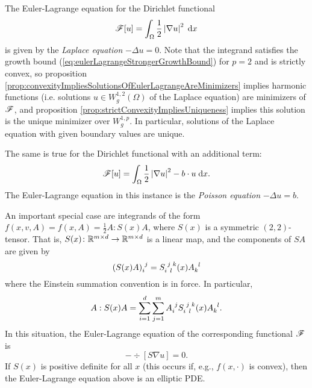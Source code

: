 \begin{example}
    The Euler-Lagrange equation for the Dirichlet functional
    \begin{equation}
        \mathscr{F}[u] = \int_{\Omega} \frac{1}{2}\left\lvert {\nabla u} \right\rvert^2 \; \mathrm{d} x
    \end{equation}
    is given by the \textit{Laplace equation} $-\Delta u = 0$. Note that the integrand satisfies the growth bound (\ref{eq:eulerLagrangeStrongerGrowthBound}) for $p=2$ and is strictly convex, so proposition \ref{prop:convexityImpliesSolutionsOfEulerLagrangeAreMinimizers} implies harmonic functions (i.e. solutions $u \in W^{1,2}_g(\Omega)$ of the Laplace equation) are minimizers of $\mathscr{F}$, and proposition \ref{prop:strictConvexityImpliesUniqueness} implies this solution is the unique minimizer over $W^{1,p}_g$. In particular, solutions of the Laplace equation with given boundary values are unique.

    The same is true for the Dirichlet functional with an additional term:
    \begin{equation}
        \mathscr{F}[u] = \int_\Omega \frac{1}{2}\left\lvert {\nabla u} \right\rvert^2 - b \cdot u \; \mathrm{d} x.
    \end{equation}
    The Euler-Lagrange equation in this instance is the \textit{Poisson equation} $- \Delta u = b$.
\end{example}

An important special case are integrands of the form $f(x,v,A) = f(x,A) = \frac{1}{2}A:S(x)A$, where $S(x)$ is a symmetric $(2,2)$-tensor. That is, $S(x) \colon \mathbb{R}^{m \times d} \to \mathbb{R}^{m \times d}$ is a linear map, and the components of $SA$ are given by 
\begin{equation}
    \tensor{(S(x)A)}{_i^j} = \tensor{S}{_i^j_l^k}(x)\tensor{A}{_k^l}
\end{equation}
where the Einstein summation convention is in force. In particular,
\begin{equation}
    A:S(x)A = \sum_{i=1}^d\sum_{j=1}^m \tensor{A}{_i^j}\tensor{S}{_i^j_l^k}(x)\tensor{A}{_k^l}.
\end{equation}
In this situation, the Euler-Lagrange equation of the corresponding functional $\mathscr{F}$ is 
\begin{equation}
    -\div[S\nabla u] = 0.
\end{equation}
If $S(x)$ is positive definite for all $x$ (this occurs if, e.g., $f(x,\cdot)$ is convex), then the Euler-Lagrange equation above is an elliptic PDE.

